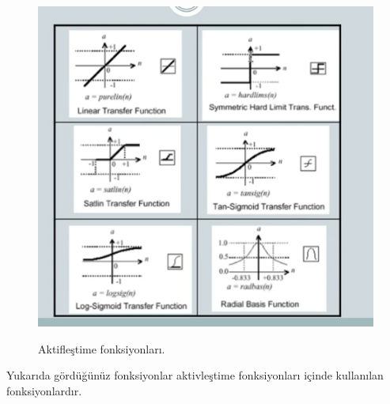 \documentclass[12pt, a4paper]{article}
\begin{document}
	\begin{figure}[!h]
		\centering
		\includegraphics{4.3.png}
		\caption{Aktifleştime fonksiyonları.}
		\cite{youtube}
	\end{figure}
	
	\newpage Yukarıda gördüğünüz fonksiyonlar aktivleştime fonksiyonları içinde kullanılan fonksiyonlardır.
	
\end{document}
